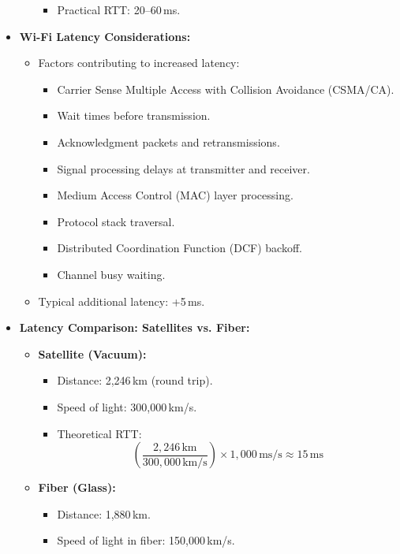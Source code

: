 \documentclass[../Main.tex]{subfiles}
\begin{document}
\begin{itemize}
\begin{itemize}
\begin{itemize}
\[            \]
            \item Practical RTT: 20--60\,ms.
        \end{itemize}
    \end{itemize}
    \item \textbf{Wi-Fi Latency Considerations:}
    \begin{itemize}
        \item Factors contributing to increased latency:
        \begin{itemize}
            \item Carrier Sense Multiple Access with Collision Avoidance (CSMA/CA).
            \item Wait times before transmission.
            \item Acknowledgment packets and retransmissions.
            \item Signal processing delays at transmitter and receiver.
            \item Medium Access Control (MAC) layer processing.
            \item Protocol stack traversal.
            \item Distributed Coordination Function (DCF) backoff.
            \item Channel busy waiting.
        \end{itemize}
        \item Typical additional latency: +5\,ms.
    \end{itemize}
    \item \textbf{Latency Comparison: Satellites vs. Fiber:}
    \begin{itemize}
        \item \textbf{Satellite (Vacuum):}
        \begin{itemize}
            \item Distance: 2,246\,km (round trip).
            \item Speed of light: 300,000\,km/s.
            \item Theoretical RTT:
            \[
            \left(\frac{2,246\,\text{km}}{300,000\,\text{km/s}}\right) \times 1,000\,\text{ms/s} \approx 15\,\text{ms}
            \]
        \end{itemize}
        \item \textbf{Fiber (Glass):}
        \begin{itemize}
            \item Distance: 1,880\,km.
            \item Speed of light in fiber: 150,000\,km/s.

\end{itemize}
\end{itemize}
\end{itemize}
\end{document}
